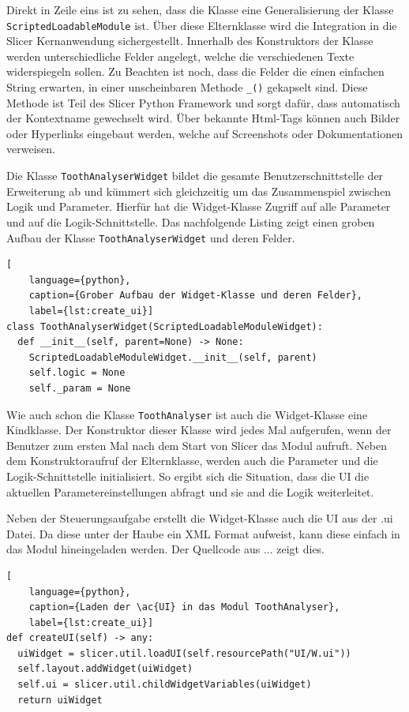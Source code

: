 Direkt in Zeile eins ist zu sehen, dass die Klasse eine Generalisierung der
Klasse \texttt{ScriptedLoadableModule} ist. Über diese Elternklasse wird die
Integration in die Slicer Kernanwendung sichergestellt. Innerhalb des Konstruktors
der Klasse werden unterschiedliche Felder angelegt, welche die verschiedenen
Texte widerspiegeln sollen. Zu Beachten ist noch, dass die Felder die einen
einfachen String erwarten, in einer unscheinbaren Methode \texttt{\_()}
gekapselt sind. Diese Methode ist Teil des Slicer Python Framework und sorgt dafür,
dass automatisch der Kontextname gewechselt wird. Über bekannte Html-Tags können
auch Bilder oder Hyperlinks eingebaut werden, welche auf Screenshots oder
Dokumentationen verweisen.

Die Klasse \texttt{ToothAnalyserWidget} bildet die gesamte Benutzerschnittstelle
der Erweiterung ab und kümmert sich gleichzeitig um das Zusammenspiel zwischen Logik
und Parameter. Hierfür hat die Widget-Klasse Zugriff auf alle Parameter und auf
die Logik-Schnittstelle. Das nachfolgende Listing zeigt einen groben Aufbau der Klasse
\texttt{ToothAnalyserWidget} und deren Felder.

\begin{lstlisting}[
    language={python},
    caption={Grober Aufbau der Widget-Klasse und deren Felder},
    label={lst:create_ui}]
class ToothAnalyserWidget(ScriptedLoadableModuleWidget):
  def __init__(self, parent=None) -> None:
    ScriptedLoadableModuleWidget.__init__(self, parent)
    self.logic = None
    self._param = None
\end{lstlisting}

Wie auch schon die Klasse \texttt{ToothAnalyser} ist auch die Widget-Klasse eine
Kindklasse. Der Konstruktor dieser Klasse wird jedes Mal aufgerufen, wenn der
Benutzer zum ersten Mal nach dem Start von Slicer das Modul aufruft. Neben dem Konstruktoraufruf
der Elternklasse, werden auch die Parameter und die Logik-Schnittstelle
initialisiert. So ergibt sich die Situation, dass die UI die aktuellen
Parametereinstellungen abfragt und sie and die Logik weiterleitet.

Neben der Steuerungsaufgabe erstellt die Widget-Klasse auch die UI aus der .ui Datei.
Da diese unter der Haube ein XML Format aufweist, kann diese einfach in das Modul
hineingeladen werden. Der Quellcode aus ... zeigt dies.

\begin{lstlisting}[
    language={python},
    caption={Laden der \ac{UI} in das Modul ToothAnalyser},
    label={lst:create_ui}]
def createUI(self) -> any:
  uiWidget = slicer.util.loadUI(self.resourcePath("UI/W.ui"))
  self.layout.addWidget(uiWidget)
  self.ui = slicer.util.childWidgetVariables(uiWidget)
  return uiWidget
\end{lstlisting}

